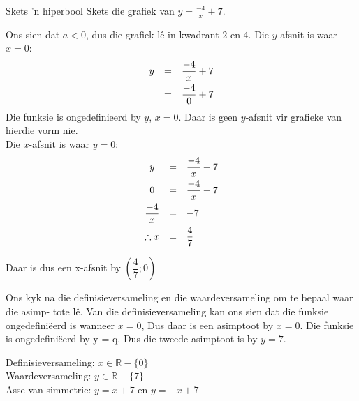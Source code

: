 \begin{wex}
{Skets ’n hiperbool}
{
Skets die grafiek van $y=\frac{-4}{x}+7$.}
{

Ons sien dat $a<0$, dus die grafiek l\^e in kwadrant $2$ en $4$.
Die $y$-afsnit is waar $x=0$:
\begin{equation*}
 \begin{array}{ccc}
 \hfill  y &= & \dfrac{-4}{x}+7 \vspace{4pt}\hfill \\
 \hfill &= & \dfrac {-4}{0} +7  \hfill \\

 \end{array}
\end{equation*}
Die funksie is ongedefinieerd by $y$, $x=0$. Daar is geen $y$-afsnit vir grafieke van hierdie vorm nie. \\
Die $x$-afsnit is waar $y=0$:
\begin{equation*}
 \begin{array}{ccl}
 y &=&  \dfrac{-4}{x}+7\vspace{4pt}\\
 0 &=&  \dfrac{-4}{x}+7\vspace{4pt}\\ 
 \dfrac{-4}{x} &=& -7\vspace{4pt} \\
\therefore x &= &\dfrac{4}{7}
 \end{array}
\end{equation*}

Daar is dus een x-afsnit by $\left(\dfrac{4}{7};0\right)$


Ons kyk na die definisieversameling en die waardeversameling om te bepaal waar die asimp-
tote lê. Van die definisieversameling kan ons sien dat die funksie ongedefiniëerd
is wanneer $x=0$, Dus daar is een asimptoot by $x=0$. Die funksie is
ongedefiniëerd by y = q. Dus die tweede asimptoot is by $y=7$. 

\setcounter{subfigure}{0}
\begin{center}
\end{center}

Definisieversameling: $x \in \mathbb{R} - \{0\}$\\
Waardeversameling: $y \in \mathbb{R} - \{7\}$\\
Asse van simmetrie: $y=x+7$ en $y=-x+7$


}
\end{wex}

